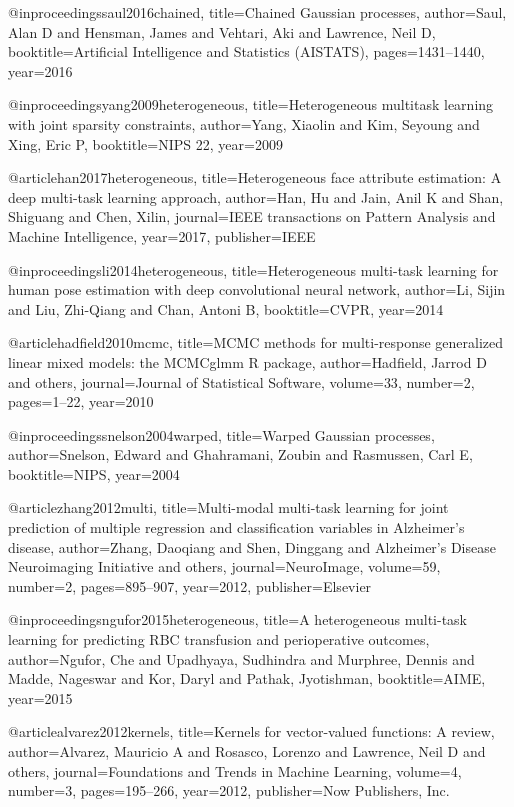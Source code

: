\documentclass[]{article}
\begin{document}
\vskip 0.2in
@inproceedings{saul2016chained,
	title={Chained {G}aussian processes},
	author={Saul, Alan D and Hensman, James and Vehtari, Aki and Lawrence, Neil D},
	booktitle={Artificial Intelligence and Statistics (AISTATS)},
	pages={1431--1440},
	year={2016}
}

@inproceedings{yang2009heterogeneous,
	title={Heterogeneous multitask learning with joint sparsity constraints},
	author={Yang, Xiaolin and Kim, Seyoung and Xing, Eric P},
	booktitle={NIPS 22},
	year={2009}
}

@article{han2017heterogeneous,
	title={Heterogeneous face attribute estimation: {A} deep multi-task learning approach},
	author={Han, Hu and Jain, Anil K and Shan, Shiguang and Chen, Xilin},
	journal={IEEE transactions on Pattern Analysis and Machine Intelligence},
	year={2017},
	publisher={IEEE}
}

@inproceedings{li2014heterogeneous,
	title={Heterogeneous multi-task learning for human pose estimation with deep convolutional neural network},	
	author={Li, Sijin and Liu, Zhi-Qiang and Chan, Antoni B},
	booktitle={CVPR},
	year={2014}
}

@article{hadfield2010mcmc,
	title={{MCMC} methods for multi-response generalized linear mixed models: the {MCMC}glmm {R} package},
	author={Hadfield, Jarrod D and others},
	journal={Journal of Statistical Software},
	volume={33},
	number={2},
	pages={1--22},
	year={2010}
}

@inproceedings{snelson2004warped,
	title={Warped {G}aussian processes},
	author={Snelson, Edward and Ghahramani, Zoubin and Rasmussen, Carl E},
	booktitle={NIPS},
	year={2004}
}

@article{zhang2012multi,
	title={Multi-modal multi-task learning for joint prediction of multiple regression and classification variables in {A}lzheimer's disease},
	author={Zhang, Daoqiang and Shen, Dinggang and Alzheimer's Disease Neuroimaging Initiative and others},
	journal={NeuroImage},
	volume={59},
	number={2},
	pages={895--907},
	year={2012},
	publisher={Elsevier}
}

@inproceedings{ngufor2015heterogeneous,
	title={A heterogeneous multi-task learning for predicting {RBC} transfusion and perioperative outcomes},
	author={Ngufor, Che and Upadhyaya, Sudhindra and Murphree, Dennis and Madde, Nageswar and Kor, Daryl and Pathak, Jyotishman},
	booktitle={AIME},
	year={2015}
}

@article{alvarez2012kernels,
	title={Kernels for vector-valued functions: {A} review},
	author={Alvarez, Mauricio A and Rosasco, Lorenzo and Lawrence, Neil D and others},
	journal={Foundations and Trends in Machine Learning},
	volume={4},
	number={3},
	pages={195--266},
	year={2012},
	publisher={Now Publishers, Inc.}
}
\end{document}
